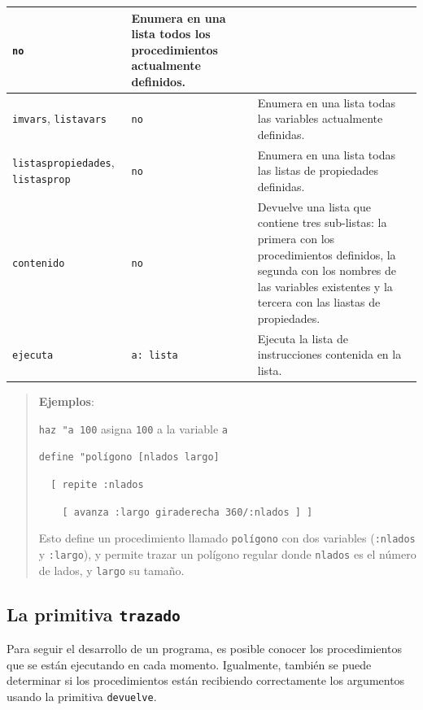\begin{center}
\begin{longtable}{|m{3.5cm}|m{3cm}|m{8.5cm}|}
        \texttt{no} & Enumera en una lista todos los procedimientos actualmente definidos.
                        \\ \hline 
   \texttt{imvars}, \index{imvars@\texttt{imvars}}
     \texttt{listavars} \index{listavars@\texttt{listavars}} & \texttt{no} &
        Enumera en una lista todas las variables actualmente definidas. \\ \hline 
   \texttt{listaspropiedades},\index{listaspropiedades@\texttt{listaspropiedades}}
     \texttt{listasprop}\index{listasprop@\texttt{listasprop}} &
        \texttt{no} & Enumera en una lista todas las listas de propiedades definidas.
                        \\ \hline 
   \texttt{contenido} \index{contenido@\texttt{contenido}} & \texttt{no} &
        Devuelve una lista que contiene tres sub-listas: la primera con los
        procedimientos definidos, la segunda con los nombres de las variables
        existentes y la tercera con las liastas de propiedades. \\ \hline
   \texttt{ejecuta} \index{ejecuta@\texttt{ejecuta}} & \texttt{a: lista} &
        Ejecuta la lista de instrucciones contenida en la lista. \\ \hline
\end{longtable} \end{center}

\begin{quote}
  \noindent \textbf{Ejemplos}: 

  \noindent \verb+haz "a 100+ asigna \texttt{100} a la variable \texttt{a} 

  \noindent \verb+define "+\texttt{pol\'igono [nlados largo]}

  \verb+  +\texttt{[ repite :nlados}

  \verb+    + \texttt{[ avanza :largo giraderecha 360/:nlados ] ]}

   \noindent Esto define un procedimiento llamado \texttt{pol\'igono} con dos
   variables (\texttt{:nlados} y \texttt{:largo}), y permite trazar un
   pol\'igono regular donde \texttt{nlados} es el n\'umero de lados, y
   \texttt{largo} su tama\~no.
\end{quote}

\subsection{La primitiva \texttt{trazado}}
   \label{La-primitiva-trazado}

Para seguir el desarrollo de un programa, es posible conocer los procedimientos
que se est\'an ejecutando en cada momento. Igualmente, tambi\'en se puede
determinar si los procedimientos est\'an recibiendo correctamente los
argumentos usando la primitiva \texttt{devuelve}.

